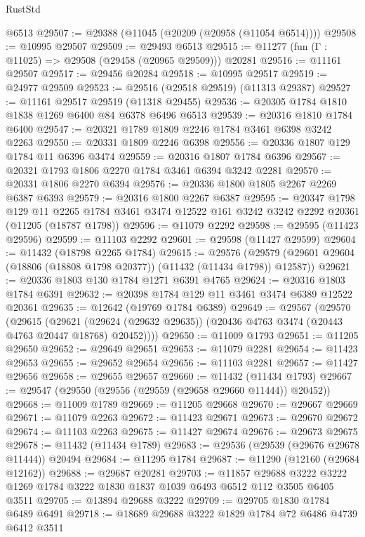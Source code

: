 \begin{lexlean}{RustStd}
\begin{coremodule}
    @6513
@29507 := @29388 (@11045 (@20209 (@20958 (@11054 @6514))))
@29508 := @10995 @29507
@29509 := @29493 @6513
@29515 := @11277 (fun (Γ : @11025) => @29508 (@29458 (@20965 @29509))) @20281
@29516 := @11161 @29507
@29517 := @29456 @20284
@29518 := @10995 @29517
@29519 := @24977 @29509
@29523 := @29516 (@29518 @29519) (@11313 @29387)
@29527 := @11161 @29517 @29519 (@11318 @29455)
@29536 := @20305 @1784 @1810 @1838 @1269 @6400 @84 @6378 @6496 @6513
@29539 := @20316 @1810 @1784 @6400
@29547 := @20321 @1789 @1809 @2246 @1784 @3461 @6398 @3242 @2263
@29550 := @20331 @1809 @2246 @6398
@29556 := @20336 @1807 @129 @1784 @11 @6396 @3474
@29559 := @20316 @1807 @1784 @6396
@29567 := @20321 @1793 @1806 @2270 @1784 @3461 @6394 @3242 @2281
@29570 := @20331 @1806 @2270 @6394
@29576 := @20336 @1800 @1805 @2267 @2269 @6387 @6393
@29579 := @20316 @1800 @2267 @6387
@29595 := @20347
    @1798
    @129
    @11
    @2265
    @1784
    @3461
    @3474
    @12522
    @161
    @3242
    @3242
    @2292
    @20361
    (@11205 (@18787 @1798))
@29596 := @11079 @2292
@29598 := @29595 (@11423 @29596)
@29599 := @11103 @2292
@29601 := @29598 (@11427 @29599)
@29604 := @11432 (@18798 @2265 @1784)
@29615 := @29576
    (@29579 (@29601 @29604 (@18806 (@18808 @1798 @20377)) (@11432 (@11434 @1798)) @12587))
@29621 := @20336 @1803 @130 @1784 @1271 @6391 @4765
@29624 := @20316 @1803 @1784 @6391
@29632 := @20398 @1784 @129 @11 @3461 @3474 @6389 @12522 @20361
@29635 := @12642 (@19769 @1784 @6389)
@29649 := @29567
    (@29570
      (@29615
        (@29621 (@29624 (@29632 @29635)) (@20436 @4763 @3474 (@20443 @4763 @20447 @18768) @20452))))
@29650 := @11009 @1793
@29651 := @11205 @29650
@29652 := @29649 @29651
@29653 := @11079 @2281
@29654 := @11423 @29653
@29655 := @29652 @29654
@29656 := @11103 @2281
@29657 := @11427 @29656
@29658 := @29655 @29657
@29660 := @11432 (@11434 @1793)
@29667 := @29547 (@29550 (@29556 (@29559 (@29658 @29660 @11444)) @20452))
@29668 := @11009 @1789
@29669 := @11205 @29668
@29670 := @29667 @29669
@29671 := @11079 @2263
@29672 := @11423 @29671
@29673 := @29670 @29672
@29674 := @11103 @2263
@29675 := @11427 @29674
@29676 := @29673 @29675
@29678 := @11432 (@11434 @1789)
@29683 := @29536 (@29539 (@29676 @29678 @11444)) @20494
@29684 := @11295 @1784
@29687 := @11290 (@12160 (@29684 @12162))
@29688 := @29687 @20281
@29703 := @11857
    @29688
    @3222
    @3222
    @1269
    @1784
    @3222
    @1830
    @1837
    @1039
    @6493
    @6512
    @112
    @3505
    @6405
    @3511
@29705 := @13894 @29688 @3222
@29709 := @29705 @1830 @1784 @6489 @6491
@29718 := @18689 @29688 @3222 @1829 @1784 @72 @6486 @4739 @6412 @3511

\end{coremodule}
\end{lexlean}
